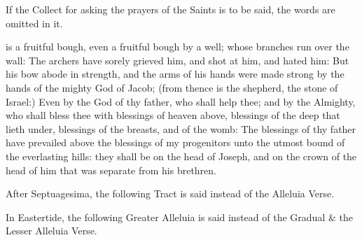 \begin{rubric}
If the Collect for asking the prayers of the Saints is to be said, the words  are omitted in it.
\end{rubric}

 is a fruitful bough, even a fruitful bough by a well; whose branches run over the wall: The archers have sorely grieved him, and shot at him, and hated him: But his bow abode in strength, and the arms of his hands were made strong by the hands of the mighty God of Jacob; (from thence is the shepherd, the stone of Israel:) Even by the God of thy father, who shall help thee; and by the Almighty, who shall bless thee with blessings of heaven above, blessings of the deep that lieth under, blessings of the breasts, and of the womb: The blessings of thy father have prevailed above the blessings of my progenitors unto the utmost bound of the everlasting hills: they shall be on the head of Joseph, and on the crown of the head of him that was separate from his brethren.


\begin{rubric}
    After Septuagesima, the following Tract is said instead of the Alleluia Verse.
\end{rubric}


\begin{rubric}
    In Eastertide, the following Greater Alleluia is said instead of the Gradual \& the Lesser Alleluia Verse.
\end{rubric}


